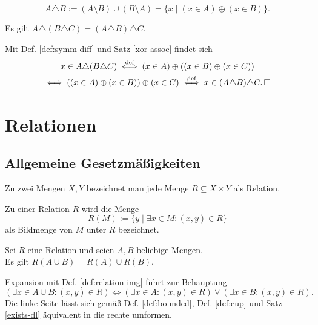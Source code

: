 \begin{Definition}\label{def:symm-diff}\newlinefirst
\[A\triangle B := (A\setminus B)\cup (B\setminus A) = \{x\mid (x\in A)\oplus (x\in B)\}.\]
\end{Definition}
\begin{Satz}
Es gilt $A\triangle (B\triangle C) = (A\triangle B)\triangle C$.
\end{Satz}
\begin{Beweis}
Mit Def. \ref{def:symm-diff} und Satz \ref{xor-assoc} findet sich
\begin{gather*}
x\in A\triangle (B\triangle C) \stackrel{\text{def}}\iff (x\in A)\oplus ((x\in B)\oplus (x\in C))\\
\iff ((x\in A)\oplus (x\in B))\oplus (x\in C)
\stackrel{\text{def}}\iff x\in (A\triangle B)\triangle C.\,\square
\end{gather*}
\end{Beweis}

\newpage
\section{Relationen}

\subsection{Allgemeine Gesetzmäßigkeiten}

\begin{Definition}[Relation]\newlinefirst
Zu zwei Mengen $X,Y$ bezeichnet man
jede Menge $R\subseteq X\times Y$ als Relation.
\end{Definition}
\begin{Definition}[Bildmenge]\label{def:relation-img}
Zu einer Relation $R$ wird die Menge
\[R(M) := \{y\mid\exists x\in M\colon (x,y)\in R\}\]
als Bildmenge von $M$ unter $R$ bezeichnet.
\end{Definition}

\begin{Satz}
Sei $R$ eine Relation und seien $A,B$ beliebige Mengen.\\
Es gilt $R(A\cup B) = R(A)\cup R(B)$.
\end{Satz}
\begin{Beweis}
Expansion mit Def. \ref{def:relation-img} führt zur Behauptung
\[(\exists x\in A\cup B\colon (x,y)\in R) \iff (\exists x\in A\colon (x,y)\in R)
\lor (\exists x\in B\colon (x,y)\in R).\]
Die linke Seite lässt sich gemäß Def. \ref{def:bounded},
Def. \ref{def:cup} und Satz \ref{exists-dl}
äquivalent in die rechte umformen.\;\qedsymbol
\end{Beweis}

